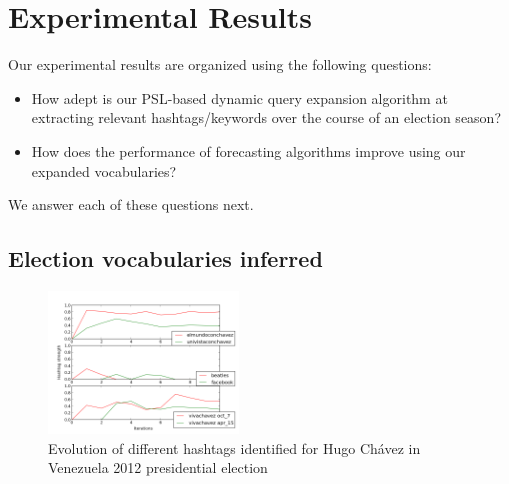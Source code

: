 \section{Experimental Results}
Our experimental results are organized using the following questions:
\begin{itemize}
\item How adept is our PSL-based dynamic query expansion algorithm at extracting relevant hashtags/keywords over the course
of an election season?
\item How does the performance of forecasting algorithms improve using our expanded vocabularies?
\end{itemize}
We answer each of these questions next.

\subsection{Election vocabularies inferred}

\begin{figure}[Ht]
	\centering
	\includegraphics[height=0.2\textheight, width=0.45\textwidth]{support_files/hashTagTimeSeries.png}
	\caption{Evolution of different hashtags identified for Hugo Ch\'{a}vez in Venezuela 2012 presidential election}
	\label{fig:timeSeries}
\end{figure}

